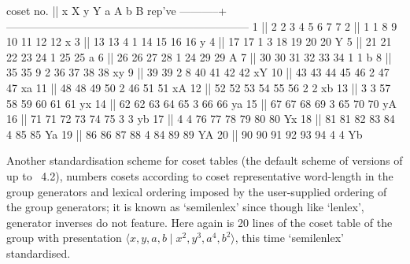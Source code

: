 \begintt
 coset no. ||      x      X      y      Y      a      A      b      B   rep've
-----------+------------------------------------------------------------------
         1 ||      2      2      3      4      5      6      7      7
         2 ||      1      1      8      9     10     11     12     12    x
         3 ||     13     13      4      1     14     15     16     16    y
         4 ||     17     17      1      3     18     19     20     20    Y
         5 ||     21     21     22     23     24      1     25     25    a
         6 ||     26     26     27     28      1     24     29     29    A
         7 ||     30     30     31     32     33     34      1      1    b
         8 ||     35     35      9      2     36     37     38     38    xy
         9 ||     39     39      2      8     40     41     42     42    xY
        10 ||     43     43     44     45     46      2     47     47    xa
        11 ||     48     48     49     50      2     46     51     51    xA
        12 ||     52     52     53     54     55     56      2      2    xb
        13 ||      3      3     57     58     59     60     61     61    yx
        14 ||     62     62     63     64     65      3     66     66    ya
        15 ||     67     67     68     69      3     65     70     70    yA
        16 ||     71     71     72     73     74     75      3      3    yb
        17 ||      4      4     76     77     78     79     80     80    Yx
        18 ||     81     81     82     83     84      4     85     85    Ya
        19 ||     86     86     87     88      4     84     89     89    YA
        20 ||     90     90     91     92     93     94      4      4    Yb
\endtt

Another standardisation scheme for coset tables (the default scheme of
versions of {\GAP} up to  {\GAP}~4.2),  numbers  cosets  according  to
coset representative word-length in the group generators  and  lexical
ordering  imposed  by  the  user-supplied  ordering   of   the   group
generators; it is known as `semilenlex' since  though  like  `lenlex',
generator inverses do not feature. Here again is 20 lines of the coset
table of the group with presentation $\langle x, y,  a,  b  \mid  x^2,
y^3, a^4, b^2\rangle$, this time `semilenlex' standardised.

